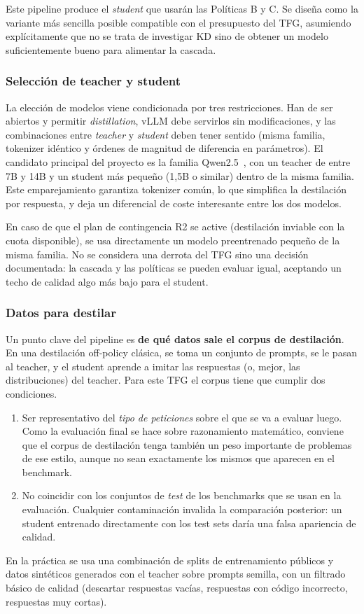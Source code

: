 Este pipeline produce el \textit{student} que usarán las Políticas B y C. Se diseña como la variante más sencilla posible compatible con el presupuesto del TFG, asumiendo explícitamente que no se trata de investigar KD sino de obtener un modelo suficientemente bueno para alimentar la cascada.

\subsubsection{Selección de teacher y student}

La elección de modelos viene condicionada por tres restricciones. Han de ser abiertos y permitir \textit{distillation}, vLLM debe servirlos sin modificaciones, y las combinaciones entre \textit{teacher} y \textit{student} deben tener sentido (misma familia, tokenizer idéntico y órdenes de magnitud de diferencia en parámetros). El candidato principal del proyecto es la familia Qwen2.5~\cite{qwen2}, con un teacher de entre 7B y 14B y un student más pequeño (1,5B o similar) dentro de la misma familia. Este emparejamiento garantiza tokenizer común, lo que simplifica la destilación por respuesta, y deja un diferencial de coste interesante entre los dos modelos.

En caso de que el plan de contingencia R2 se active (destilación inviable con la cuota disponible), se usa directamente un modelo preentrenado pequeño de la misma familia. No se considera una derrota del TFG sino una decisión documentada: la cascada y las políticas se pueden evaluar igual, aceptando un techo de calidad algo más bajo para el student.

\subsubsection{Datos para destilar}

Un punto clave del pipeline es \textbf{de qué datos sale el corpus de destilación}. En una destilación off-policy clásica, se toma un conjunto de prompts, se le pasan al teacher, y el student aprende a imitar las respuestas (o, mejor, las distribuciones) del teacher. Para este TFG el corpus tiene que cumplir dos condiciones.
\begin{enumerate}[nosep,leftmargin=*]
\item Ser representativo del \textit{tipo de peticiones} sobre el que se va a evaluar luego. Como la evaluación final se hace sobre razonamiento matemático, conviene que el corpus de destilación tenga también un peso importante de problemas de ese estilo, aunque no sean exactamente los mismos que aparecen en el benchmark.
\item No coincidir con los conjuntos de \textit{test} de los benchmarks que se usan en la evaluación. Cualquier contaminación invalida la comparación posterior: un student entrenado directamente con los test sets daría una falsa apariencia de calidad.
\end{enumerate}
En la práctica se usa una combinación de splits de entrenamiento públicos y datos sintéticos generados con el teacher sobre prompts semilla, con un filtrado básico de calidad (descartar respuestas vacías, respuestas con código incorrecto, respuestas muy cortas).

